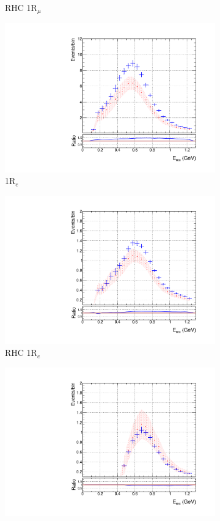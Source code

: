 \begin{figure}[!htbp]
\begin{subfigure}{.49\textwidth}
   \caption{RHC 1R$_{\mu}$}
\end{subfigure}
\begin{subfigure}{.49\textwidth}
  \centering
  \includegraphics[width=0.95\linewidth]{figs/skspecpolynue}
  \caption{1R$_{e}$}
\end{subfigure}
\begin{subfigure}{.49\textwidth}
  \centering
  \includegraphics[width=0.95\linewidth]{figs/skspecpolynuebar}
   \caption{RHC 1R$_{e}$}
  \end{subfigure}
\begin{subfigure}{.49\textwidth}
  \centering
  \includegraphics[width=0.95\linewidth]{figs/skspecpolynue1pi}

\end{subfigure}
\end{figure}

